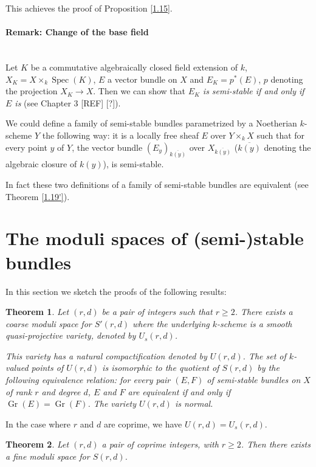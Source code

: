 \documentclass[12pt,a4paper]{book}
\DeclareMathOperator\Spec{Spec}
\DeclareMathOperator\Gr{Gr}
\newtheorem{thm}{Theorem}[chapter]
\theoremstyle{definition} \newtheorem{defn}[thm]{Definition}
\theoremstyle{definition} \newtheorem{ejs}[thm]{Examples}
\theoremstyle{definition} \newtheorem{ej}[thm]{Example}
\begin{document}
    This achieves the proof of Proposition \ref{1.15}. \\

  \paragraph{Remark: Change of the base field} \ \\
  Let $K$ be a commutative algebraically closed field extension of $k$, $X_K=X\times_k \Spec(K)$, $E$ a vector bundle on $X$ and $E_K=p^*(E)$, $p$ denoting the projection $X_K \rightarrow X$. Then we can show that $E_K$ \emph{is semi-stable if and only if $E$ is} (see Chapter 3 [REF] [?]).
  
  We could define a family of semi-stable bundles parametrized by a Noetherian $k$-scheme $Y$ the following way: it is a locally free sheaf $E$ over $Y\times_k X$ such that for every point $y$ of $Y$, the vector bundle $(E_y)_{\overline{k(y)}}$ over $X_{\overline{k(y)}}$ ($\overline{k(y)}$ denoting the algebraic closure of $k(y)$), is semi-stable.

  In fact these two definitions of a family of semi-stable bundles are equivalent (see Theorem \ref{1.19'}).

  \section{The moduli spaces of (semi-)stable bundles}\label{section 1III}
  In this section we sketch the proofs of the following results:
  \begin{thm}\label{1.17}
    Let $(r,d)$ be a pair of integers such that $r\geq 2$. There exists a coarse moduli space for $S'(r,d)$ where the underlying $k$-scheme is a smooth quasi-projective variety, denoted by $U_s(r,d)$.

    This variety has a natural compactification denoted by $U(r,d)$. The set of $k$-valued points of $U(r,d)$ is isomorphic to the quotient of $S(r,d)$ by the following equivalence relation: for every pair $(E,F)$ of semi-stable bundles on $X$ of rank $r$ and degree $d$, $E$ and $F$ are equivalent if and only if $\Gr(E)=\Gr(F)$. The variety $U(r,d)$ is normal.
  \end{thm}

  In the case where $r$ and $d$ are coprime, we have $U(r,d)=U_s(r,d)$.

  \begin{thm}\label{1.18}
    Let $(r,d)$ a pair of coprime integers, with $r\geq 2$. Then there exists a fine moduli space for $S(r,d)$.
  \end{thm}
\end{document}
